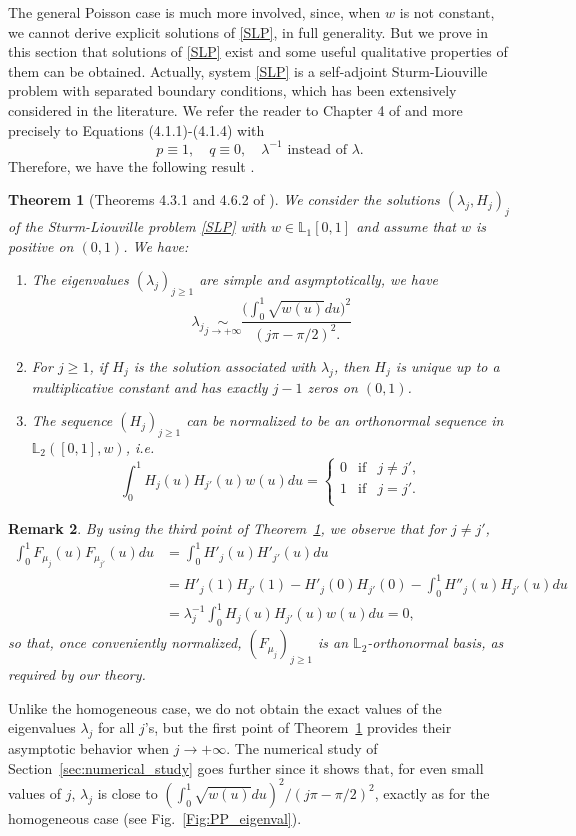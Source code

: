 \documentclass[aos]{imsart}
\theoremstyle{plain}
\newtheorem{theorem}{Theorem}[section]
\newtheorem{remark}[theorem]{Remark}
\theoremstyle{remark}
\newcommand{\1}{1}
\begin{document}
The general Poisson case is much more involved, since, when $w$ is not constant, we cannot derive explicit solutions of \eqref{SLP}, in full generality. But we prove in this section that solutions of \eqref{SLP} exist and some useful qualitative properties of them can be obtained. Actually, system \eqref{SLP} is a self-adjoint Sturm-Liouville problem with separated boundary conditions, which has been extensively considered in the literature. We refer the reader to Chapter 4 of \cite{Zettl-book} and more precisely to Equations (4.1.1)-(4.1.4) with
$$p\equiv1,\quad q\equiv0,\quad \lambda^{-1} \mbox{ instead of } \lambda.$$
Therefore, we have the following result \cite{Zettl-book}.
\begin{theorem}[Theorems 4.3.1 and 4.6.2 of \cite{Zettl-book}]\label{thm:inhPP}
We consider the solutions $(\lambda_j,H_j)_{j}$  of the Sturm-Liouville problem \eqref{SLP} with $w\in{\mathbb L}_1[0,1]$ and assume that $w$ is positive on $(0,1)$. We have:
\begin{enumerate}
\item The eigenvalues $(\lambda_j)_{j\geq 1} $ are simple and asymptotically, we have
$$\lambda_j  \underset{j\to+\infty}{\sim}\frac{\Big(\int_0^1\sqrt{w(u)}du\Big)^2}{(j\pi-\pi/2)^2.}$$
\item For $j\geq 1$, if $H_j$ is the solution associated with $\lambda_j$, then $H_j$ is unique up to a multiplicative constant and has exactly $j-1$ zeros on $(0,1)$.
\item The sequence $(H_j)_{j\geq 1}$ can be normalized to be an orthonormal sequence in ${\mathbb L}_2([0,1],w)$, i.e.
$$
\int_0^1H_j(u)H_{j'}(u)w(u)du=\left\{
\begin{array}{ccc}
0  &\mbox{if}   &j\not=j',   \\
 1 & \mbox{if}   &j=j'.   \\
 \end{array}
\right.
$$
\end{enumerate}
\end{theorem}

\begin{remark}
By using the third point of Theorem~\ref{thm:inhPP}, we observe that for $j\not=j'$,
\begin{align*}
\int_0^1F_{\mu_j}(u)F_{\mu_{j'}}(u)du&=\int_0^1H'_j(u)H'_{j'}(u)du\\&=H'_j(1)H_{j'}(1)-H'_j(0)H_{j'}(0)-\int_0^1H''_j(u)H_{j'}(u)du\\
&=\lambda_j^{-1}\int_0^1H_j(u)H_{j'}(u)w(u)du=0,
\end{align*}
so that, once conveniently normalized, $(F_{\mu_j})_{j\geq 1}$ is an ${\mathbb L}_2$-orthonormal basis, as required by our theory. 
\end{remark}
Unlike the homogeneous case, we do not obtain the exact values of the eigenvalues $\lambda_j$ for all $j$'s, but the first point of Theorem~\ref{thm:inhPP} provides their asymptotic behavior when $j\to+\infty$. The numerical study of Section~\ref{sec:numerical_study} goes further since it shows that, for even small values of $j$, $\lambda_j$ is close to $(\int_0^1 \sqrt{w(u)}du)^2/(j \pi - \pi/2)^{2}$, exactly as for the homogeneous case (see Fig.~\ref{Fig:PP_eigenval}).
\end{document}
